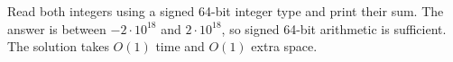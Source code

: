 Read both integers using a signed 64-bit integer type and print their sum.
The answer is between $-2\cdot 10^{18}$ and $2\cdot 10^{18}$, so signed 64-bit arithmetic is sufficient.
The solution takes $O(1)$ time and $O(1)$ extra space.
